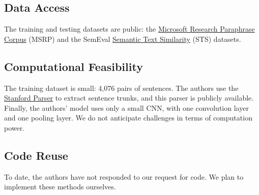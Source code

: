 \documentclass[11pt,a4paper]{article}
\begin{document}
\subsection{Data Access}
The training and testing datasets are public: the \href{https://www.microsoft.com/en-us/download/details.aspx?id=52398}{Microsoft Research Paraphrase Corpus} (MSRP) and the SemEval \href{https://github.com/brmson/dataset-sts/tree/master/data/sts/semeval-sts}{Semantic Text Similarity} (STS) datasets.

\subsection{Computational Feasibility}
The training dataset is small: 4,076 pairs of sentences. The authors use the \href{https://nlp.stanford.edu/software/lex-parser.shtml}{Stanford Parser} to extract sentence trunks, and this parser is publicly available. Finally, the authors' model uses only a small CNN, with one convolution layer and one pooling layer. We do not anticipate challenges in terms of computation power. 

\subsection{Code Reuse}
To date, the authors have not responded to our request for code. We plan to implement these methods ourselves. 
\end{document}
